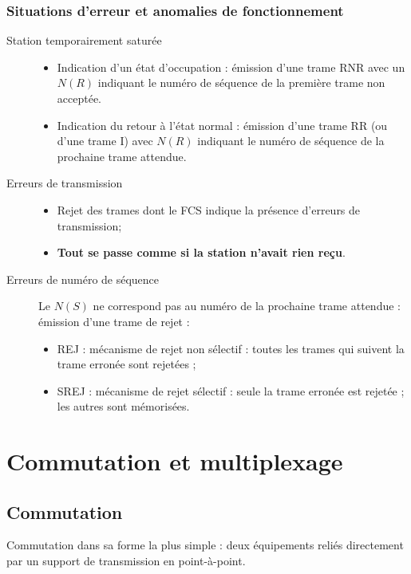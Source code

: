 \documentclass[11pt,english,french]{scrreprt}
\theoremstyle{remark}
\theoremstyle{definition}
\begin{document}
\subsection{Situations d'erreur et anomalies de fonctionnement} %

\begin{description}
	\item [Station temporairement saturée] \hfill\begin{itemize}
		\item Indication d'un état d'occupation : émission d'une trame RNR avec un $N(R)$ indiquant le numéro de séquence de la première trame non acceptée.
		\item Indication du retour à l'état normal : émission d'une trame RR (ou d'une trame I) avec $N(R)$ indiquant le numéro de séquence de la prochaine trame attendue.
	\end{itemize}
	\item[Erreurs de transmission] \hfill \begin{itemize}
		\item Rejet des trames dont le FCS indique la présence d'erreurs de transmission;
		\item \textbf{Tout se passe comme si la station n'avait rien reçu}.
	\end{itemize}
	\item[Erreurs de numéro de séquence] Le $N(S)$ ne correspond pas au numéro de la prochaine trame attendue : émission d'une trame de rejet : \begin{itemize}
		\item REJ : mécanisme de rejet non sélectif : toutes les trames qui suivent la trame erronée sont rejetées ;
		\item SREJ : mécanisme de rejet sélectif : seule la trame erronée est rejetée ; les autres sont mémorisées.
	\end{itemize}
\end{description}

\chapter{Commutation et multiplexage} %

\section{Commutation} %

Commutation dans sa forme la plus simple : deux équipements reliés directement par un support de transmission en point-à-point.
\end{document}
